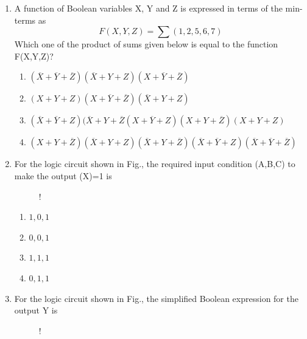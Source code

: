 \documentclass[journal,12pt,twocolumn]{IEEEtran}
\begin{document}
\begin{enumerate}
\begin{enumerate}
    \end{enumerate}
\item A function of Boolean variables X, Y and Z is expressed in terms of the min-terms as $$F(X,Y,Z)=\sum(1,2,5,6,7)$$ Which one of the product of sums given below is equal to the function F(X,Y,Z)?
    \begin{enumerate}
      \item $(\overline{X}+\overline{Y}+\overline{Z})(\overline{X}+Y+Z)(X+\overline{Y}+\overline{Z})$
      \item $(X+Y+Z)(X+\overline{Y}+\overline{Z})(\overline{X}+Y+Z)$
      \item $(\overline{X}+\overline{Y}+Z)(\overline{X}+Y+\overline{Z}(X+\overline{Y}+Z)(X+Y+\overline{Z})(X+Y+Z)$
      \item $(X+Y+\overline{Z})(\overline{X}+Y+Z)(\overline{X}+Y+\overline{Z})(\overline{X}+\overline{Y}+Z)(\overline{X}+\overline{Y}+\overline{Z})$
    \end{enumerate}

\item For the logic circuit shown in Fig., the required input condition (A,B,C) to
make the output (X)=1 is
%
\begin{figure}[!h]
\centering
\resizebox {\columnwidth} {!} {

}
\caption{}
\end{figure}
%
    
     \begin{enumerate}
      \item $ 1,0,1$
      \item $0,0,1$
      \item $1,1,1$
      \item $0,1,1$
    \end{enumerate}
   
    
    \item For the logic circuit shown in Fig., the simplified Boolean expression for the
output Y is
\begin{figure}[!h]
\centering
\resizebox {\columnwidth} {!} {

}
\caption{}
\end{figure}

%


\end{enumerate}
\end{document}
